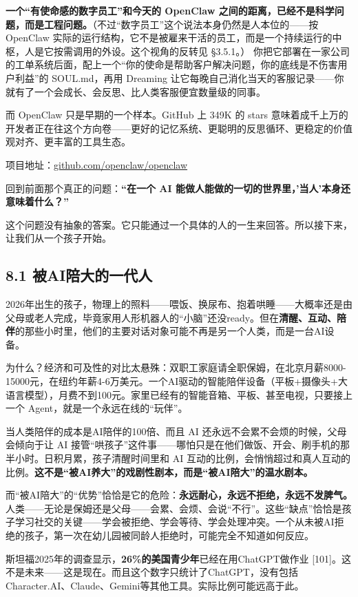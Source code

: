 \documentclass[11pt,a4paper]{ctexart}
\begin{document}
\textbf{一个“有使命感的数字员工”和今天的 OpenClaw 之间的距离，已经不是科学问题，而是工程问题。}（不过“数字员工”这个说法本身仍然是人本位的——按 OpenClaw 实际的运行结构，它不是被雇来干活的员工，而是一个持续运行的中枢，人是它按需调用的外设。这个视角的反转见 \S{}3.5.1。） 你把它部署在一家公司的工单系统后面，配上一个“你的使命是帮助客户解决问题，你的底线是不伤害用户利益”的 SOUL.md，再用 Dreaming 让它每晚自己消化当天的客服记录——你就有了一个会成长、会反思、比人类客服便宜数量级的同事。

而 OpenClaw 只是早期的一个样本。GitHub 上 349K 的 stars 意味着成千上万的开发者正在往这个方向卷——更好的记忆系统、更聪明的反思循环、更稳定的价值观对齐、更丰富的工具生态。

项目地址：\href{https://github.com/openclaw/openclaw}{github.com/openclaw/openclaw}

回到前面那个真正的问题：\textbf{“在一个 AI 能做人能做的一切的世界里，'当人'本身还意味着什么？”}

这个问题没有抽象的答案。它只能通过一个具体的人的一生来回答。所以接下来，让我们从一个孩子开始。

\subsection{8.1 被AI陪大的一代人}

2026年出生的孩子，物理上的照料——喂饭、换尿布、抱着哄睡——大概率还是由父母或老人完成，毕竟家用人形机器人的“小脑”还没ready。但在\textbf{清醒、互动、陪伴}的那些小时里，他们的主要对话对象可能不再是另一个人类，而是一台AI设备。

为什么？经济和可及性的对比太悬殊：双职工家庭请全职保姆，在北京月薪8000-15000元，在纽约年薪4-6万美元。一个AI驱动的智能陪伴设备（平板+摄像头+大语言模型），月费不到100元。家里已经有的智能音箱、平板、甚至电视，只要接上一个 Agent，就是一个永远在线的“玩伴”。

当人类陪伴的成本是AI陪伴的100倍、而且 AI 还永远不会累不会烦的时候，父母会倾向于让 AI 接管“哄孩子”这件事——哪怕只是在他们做饭、开会、刷手机的那半小时。日积月累，孩子清醒时间里和 AI 互动的比例，会悄悄超过和真人互动的比例。\textbf{这不是“被AI养大”的戏剧性剧本，而是“被AI陪大”的温水剧本。}

而“被AI陪大”的“优势”恰恰是它的危险：\textbf{永远耐心，永远不拒绝，永远不发脾气。} 人类——无论是保姆还是父母——会累、会烦、会说“不行”。这些“缺点”恰恰是孩子学习社交的关键——学会被拒绝、学会等待、学会处理冲突。一个从未被AI拒绝的孩子，第一次在幼儿园被同龄人拒绝时，可能完全不知道如何反应。

斯坦福2025年的调查显示，\textbf{26\%的美国青少年}已经在用ChatGPT做作业 [101]。这不是未来——这是现在。而且这个数字只统计了ChatGPT，没有包括Character.AI、Claude、Gemini等其他工具。实际比例可能远高于此。
\end{document}
